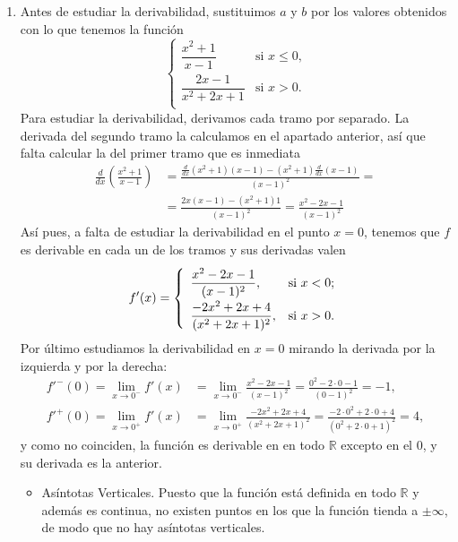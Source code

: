 {\begin{enumerate}
\item Antes de estudiar la derivabilidad, sustituimos $a$ y $b$ por los valores obtenidos con lo que tenemos la función
\[
\renewcommand{\arraystretch}{2}
\begin{cases}
\dfrac{x^2  + 1}{x - 1} & \mbox{si $x \leq 0$,} \\
\dfrac{2x-1}{x^2  + 2x + 1} & \mbox{si $x>0$.} \\
\end{cases}
\]
Para estudiar la derivabilidad, derivamos cada tramo por separado. La derivada del segundo tramo la calculamos en el apartado anterior, así que falta calcular la del primer tramo que es inmediata
\begin{align*}
\frac{d}{dx}\left(\frac{x^2+1}{x-1}\right) &=\frac{\frac{d}{dx}(x^2+1)(x-1)-(x^2+1)\frac{d}{dx}(x-1)}{(x-1)^2}=\\
&=\frac{2x(x-1)-(x^2+1)1}{(x-1)^2}=\frac{x^2-2x-1}{(x-1)^2}
\end{align*}
Así pues, a falta de estudiar la derivabilidad en el punto $x=0$, tenemos que $f$ es derivable en cada un de los tramos y sus derivadas valen
\[\renewcommand{\arraystretch}{2}
f'(x)=\left\{%
\begin{array}{ll}
\dfrac{x^2-2x-1}{(x-1)^2}, & \hbox{si $x<0$;} \\
\dfrac{-2x^2+2x+4}{(x^2+2x+1)^2}, & \hbox{si $x>0$.} \\
\end{array}%
\right. 
\] 
Por último estudiamos la derivabilidad en $x=0$ mirando la derivada por la izquierda y por la derecha:
\begin{align*}
f'^-(0)=\lim_{x\rightarrow 0^-}f'(x)&=\lim_{x\rightarrow 0^-}\frac{x^2-2x-1}{(x-1)^2}=\frac{0^2-2\cdot 0-1}{(0-1)^2}=-1,\\
f'^+(0)=\lim_{x\rightarrow 0^+}f'(x)&=\lim_{x\rightarrow 0^+}\frac{-2x^2+2x+4}{(x^2+2x+1)^2}=\frac{-2\cdot 0^2+2\cdot 0+4}{(0^2+2\cdot 0+1)^2}=4,
\end{align*}
y como no coinciden, la función es derivable en en todo $\mathbb{R}$ excepto en el 0, y su derivada es la anterior.

\begin{itemize}
\item Asíntotas Verticales. Puesto que la función está definida en todo $\mathbb{R}$ y además es continua, no existen puntos en los que la función tienda a $\pm\infty$, de modo que no hay asíntotas verticales. 


\end{itemize}
\end{enumerate}}
